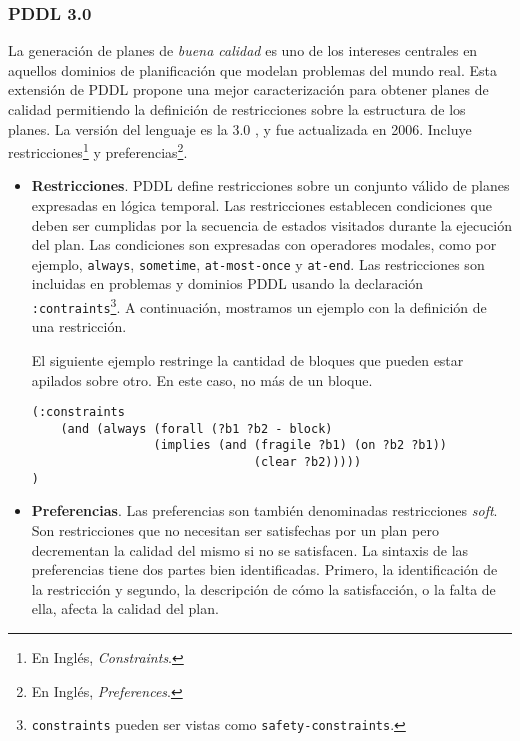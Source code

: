\subsubsection{PDDL 3.0}

La generaci\'on de planes de \emph{buena calidad} es uno
de los intereses centrales en aquellos
dominios de planificaci\'on que modelan problemas del
mundo real. Esta extensi\'on de PDDL propone una mejor
caracterizaci\'on para obtener planes de calidad permitiendo
la definici\'on de restricciones sobre la estructura
de los planes.
La versi\'on del lenguaje es la 3.0 \cite{gbraun:pddl301}, \cite{gbraun:pddl30}
y fue actualizada en 2006. Incluye restricciones\footnote{En Ingl\'es,
\emph{Constraints}.} y 
preferencias\footnote{En Ingl\'es, \emph{Preferences}.}.

	\begin{itemize}
	
	\item {\bf Restricciones}. PDDL define restricciones sobre
	un conjunto v\'alido de planes expresadas en l\'ogica temporal.
	Las restricciones establecen condiciones que deben ser cumplidas
	por la secuencia de estados visitados durante la ejecuci\'on del 
	plan. Las condiciones son expresadas con operadores modales, como
	por ejemplo, \texttt{always}, \texttt{sometime}, \texttt{at-most-once}
	y \texttt{at-end}. Las restricciones son incluidas en problemas y dominios PDDL
	usando la declaraci\'on \texttt{:contraints}\footnote{\texttt{constraints} pueden
	ser vistas como \texttt{safety-constraints}.}.
	A continuaci\'on, mostramos un ejemplo con la definici\'on de una restricci\'on.
	
	\begin{ejemplo}%
	
	El siguiente ejemplo restringe la cantidad de bloques que 
	pueden estar apilados sobre otro. En este caso, no m\'as de un bloque.
	
	\begin{verbatim}
(:constraints
    (and (always (forall (?b1 ?b2 - block)
                 (implies (and (fragile ?b1) (on ?b2 ?b1)) 
                               (clear ?b2)))))
)
	\end{verbatim}
	\end{ejemplo} 
	
	\item {\bf Preferencias}. Las preferencias son tambi\'en denominadas
	restricciones \emph{soft}. Son restricciones que no necesitan ser
	satisfechas por un plan pero decrementan la calidad del mismo si no se 
	satisfacen. La sintaxis de las preferencias tiene dos partes bien
	identificadas. Primero, la identificaci\'on de la restricci\'on y segundo,
	la descripci\'on de c\'omo la satisfacci\'on, o la falta de ella, afecta la 
	calidad del plan.
	

\end{itemize}
